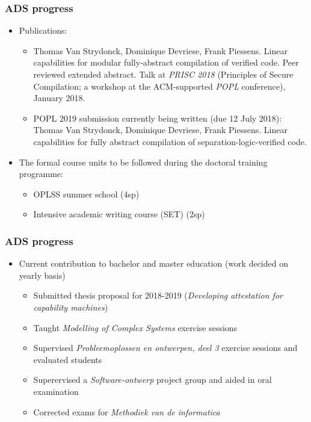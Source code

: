 \documentclass{beamer}
\begin{document}
\begin{frame}
\frametitle{ADS progress}
\begin{itemize}
\item Publications:
	\begin{itemize}
	\item Thomas Van Strydonck, Dominique Devriese, Frank Piessens. Linear capabilities for modular fully-abstract compilation of verified code. Peer reviewed extended abstract. Talk at \emph{PRISC 2018}  (Principles of Secure Compilation; a workshop at the ACM-supported \emph{POPL} conference), January 2018.
	\item POPL 2019 submission currently being written (due 12 July 2018): Thomas Van Strydonck, Dominique Devriese, Frank Piessens. Linear capabilities for fully abstract compilation of separation-logic-verified code.
	\end{itemize}
\item The formal course units to be followed during the doctoral training programme:
	\begin{itemize}
	\item OPLSS summer school (4sp)
	\item Intensive academic writing course (SET) (2sp)	
	\end{itemize}
\end{itemize}
\end{frame}

\begin{frame}
\frametitle{ADS progress}
\begin{itemize}
\item Current contribution to bachelor and master education (work decided on yearly basis)
	\begin{itemize}
	\item Submitted thesis proposal for 2018-2019 (\emph{Developing attestation for capability machines})
	\item Taught \emph{Modelling of Complex Systems}  exercise sessions
	\item Supervised \emph{Probleemoplossen en ontwerpen, deel 3} exercise sessions and evaluated students
	\item Superervised a \emph{Software-ontwerp} project group and aided in oral examination
	\item Corrected exams for \emph{Methodiek van de informatica}
	\end{itemize}
\end{itemize}
\end{frame}
\end{document}
